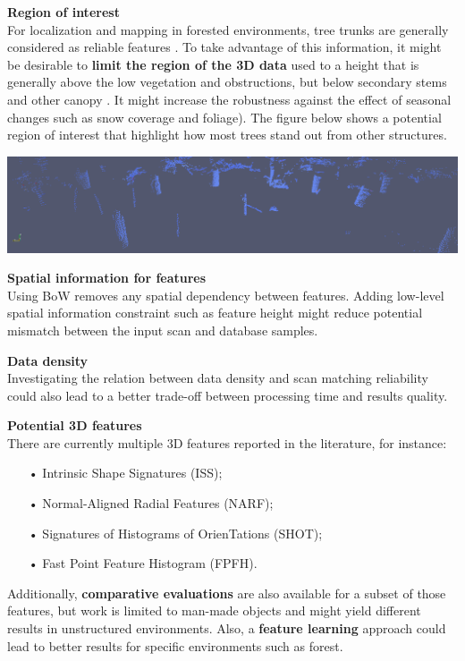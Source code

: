 \documentclass[a0paper,portrait]{baposter}
\begin{document}
\begin{poster}
{        \textbf{Region of interest}\\
        For localization and mapping in forested environments, tree trunks are generally considered as reliable features \cite{Song2012}. To take advantage of this information, it might be desirable to \textbf{limit the region of the 3D data} used to a height that is generally above the low vegetation and obstructions, but below secondary stems and other canopy \cite{Mcdaniel2012}. It might increase the robustness against the effect of seasonal changes such as snow coverage and foliage). The figure below shows a potential region of interest that highlight how most trees stand out from other structures.
        \begin{center}
            \includegraphics[width=0.95\linewidth]{./figures/pointcloudSlice.png}
        \end{center}

        \textbf{Spatial information for features}\\
        Using BoW removes any spatial dependency between features. Adding low-level spatial information constraint such as feature height might reduce potential mismatch between the input scan and database samples.\vspace{1em}

        \textbf{Data density}\\
        Investigating the relation between data density and scan matching reliability could also lead to a better trade-off between processing time and results quality.\vspace{1em}

        \textbf{Potential 3D features}\\
        There are currently multiple 3D features reported in the literature, for instance:
        \begin{itemize}
            \item[•] Intrinsic Shape Signatures (ISS);
            \item[•] Normal-Aligned Radial Features (NARF);
            \item[•] Signatures of Histograms of OrienTations (SHOT);
            \item[•] Fast Point Feature Histogram (FPFH).
        \end{itemize}
        Additionally, \textbf{comparative evaluations} \cite{boyer2011shrec} \cite{Filipe2014} are also available for a subset of those features, but work is limited to man-made objects and might yield different results in unstructured environments. Also, a \textbf{feature learning} approach could lead to better results for specific environments such as forest.\vspace{1em}

}
\end{poster}
\end{document}
